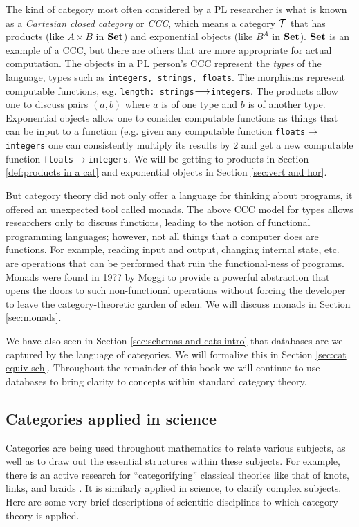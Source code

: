 The kind of category most often considered by a PL researcher is what is known as a {\em Cartesian closed category} or {\em CCC}, which means a category $\mathcal{T}$ that has products (like $A\times B$ in ${\bf Set}$) and exponential objects (like $B^A$ in ${\bf Set}$). ${\bf Set}$ is an example of a CCC, but there are others that are more appropriate for actual computation. The objects in a PL person's CCC represent the {\em types} of the language, types such as {\tt integers, strings, floats}. The morphisms represent computable functions, e.g. {\tt length: strings}$\longrightarrow${\tt integers}. The products allow one to discuss pairs $(a,b)$ where $a$ is of one type and $b$ is of another type. Exponential objects allow one to consider computable functions as things that can be input to a function (e.g. given any computable function {\tt floats}$\to${\tt integers} one can consistently multiply its results by 2 and get a new computable function {\tt floats}$\to${\tt integers}. We will be getting to products in Section \ref{def:products in a cat} and exponential objects in Section \ref{sec:vert and hor}. 

But category theory did not only offer a language for thinking about programs, it offered an unexpected tool called monads. The above CCC model for types allows researchers only to discuss functions, leading to the notion of functional programming languages; however, not all things that a computer does are functions. For example, reading input and output, changing internal state, etc. are operations that can be performed that ruin the functional-ness of programs. Monads were found in 19?? by Moggi \cite{Mog} to provide a powerful abstraction that opens the doors to such non-functional operations without forcing the developer to leave the category-theoretic garden of eden. We will discuss monads in Section \ref{sec:monads}.

We have also seen in Section \ref{sec:schemas and cats intro} that databases are well captured by the language of categories. We will formalize this in Section \ref{sec:cat equiv sch}. Throughout the remainder of this book we will continue to use databases to bring clarity to concepts within standard category theory. 
 

\subsection{Categories applied in science} 

Categories are being used throughout mathematics to relate various subjects, as well as to draw out the essential structures within these subjects. For example, there is an active research for “categorifying” classical theories like that of knots, links, and braids \cite{Kho}. It is similarly applied in science, to clarify complex subjects. Here are some very brief descriptions of scientific disciplines to which category theory is applied.

